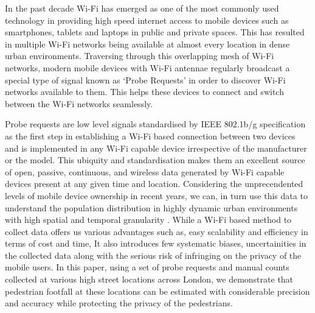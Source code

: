 In the past decade Wi-Fi has emerged as one of the most commonly used technology
in providing high speed internet access to mobile devices such as smartphones,
tablets and laptops in public and private spaces. This has resulted in multiple
Wi-Fi networks being available at almost every location in dense urban
environments. Traversing through this overlapping mesh of Wi-Fi networks, modern
mobile devices with Wi-Fi antennae regularly broadcast a special type of signal
known as `Probe Requests' in order to discover Wi-Fi networks available to them.
This helps these devices to connect and switch between the Wi-Fi networks
seamlessly.

Probe requests are low level signals standardised by IEEE 802.1b/g specification
\citep{ieee2013} as the first step in establishing a Wi-Fi based connection
between two devices and is implemented in any Wi-Fi capable device irrespective
of the manufacturer or the model. This ubiquity and standardisation makes them
an excellent source of open, passive, continuous, and wireless data generated by
Wi-Fi capable devices present at any given time and location. Considering the
unprecendented levels of mobile device ownership in recent years, we can, in
turn use this data to understand the population distribution in highly dynamic
urban environments with high spatial and temporal granularity
\citep{freud2015,konto2017}. While a Wi-Fi based method to collect data offers
us various advantages such as, easy scalability and efficiency in terms of cost
and time, It also introduces few systematic biases, uncertainities in the
collected data along with the serious risk of infringing on the privacy of the
mobile users. In this paper, using a set of probe requests and manual counts
collected at various high street locations across London, we demonstrate that
pedestrian footfall at these locations can be estimated with considerable
precision and accuracy while protecting the privacy of the pedestrians.


